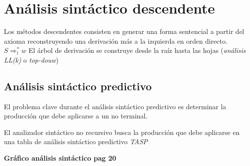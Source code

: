 %
%
%
%

\section{Análisis sintáctico descendente}

Los métodos descendentes consisten en generar una forma sentencial  a partir del axioma reconstruyendo una  derivación más a la izquierda en orden directo. $S\Rightarrow_{l}^{*}w$
El árbol de derivación se construye desde la raíz hasta las hojas (\textit{análisis LL(k)} o \textit{top-douw})

\subsection{Análisis sintáctico predictivo}

El problema clave durante el análisis sintáctico predictivo es determinar la producción que debe aplicarse a un no terminal. 

El analizador sintáctico no recursivo  busca la producción que debe aplicarse en una tabla de análisis sintáctico predictivo \textit{TASP}

              \textbf{{\LARGE Gráfico análisis sintáctico pag 20}}
              
